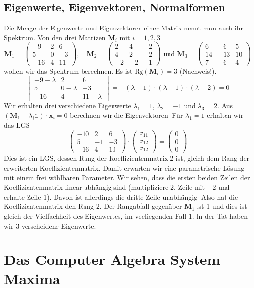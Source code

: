 \subsection{Eigenwerte, Eigenvektoren, Normalformen}
Die Menge der Eigenwerte und Eigenvektoren einer Matrix nennt man auch ihr Spektrum. Von den drei Matrizen $\mathbf{M}_i$ mit $i=1,2,3$
\[
  \mathbf{M}_1=\begin{pmatrix}
    -9&2&6\\5&0&-3\\-16&4&11
  \end{pmatrix},\quad
  \mathbf{M}_2=\begin{pmatrix}
    2&4&-2\\4&2&-2\\-2&-2&-1
  \end{pmatrix}\text{ und }
  \mathbf{M}_3=\begin{pmatrix}
    6&-6&5\\14&-13&10\\7&-6&4
  \end{pmatrix}
\]
wollen wir das Spektrum berechnen. Es ist $\text{Rg}(\mathbf{M}_i)=3$ (Nachweis!).
\[
  \begin{vmatrix}
    -9-\lambda&2&6\\5&0-\lambda&-3\\-16&4&11-\lambda
  \end{vmatrix}
  =-(\lambda-1)\cdot(\lambda+1)\cdot(\lambda-2)=0
\]
Wir erhalten drei verschiedene Eigenwerte $\lambda_1=1$, $\lambda_2=-1$ und $\lambda_3=2$. Aus $(\mathbf{M}_1-\lambda_i\mathds{1})\cdot\mathbf{x}_i=0$ berechnen wir die Eigenvektoren.  Für $\lambda_1=1$ erhalten wir das LGS \[
 \begin{pmatrix}-10&2&6\\5&-1&-3\\-16&4&10\end{pmatrix}\cdot
 \begin{pmatrix}x_{11}\\x_{12}\\x_{12}\end{pmatrix}=
 \begin{pmatrix}0\\0\\0\end{pmatrix}
\]
Dies ist ein LGS, dessen Rang der Koeffizientenmatrix 2 ist, gleich dem Rang der erweiterten Koeffizientenmatrix. Damit erwarten wir eine parametrische Lösung mit einem frei wählbaren Parameter.
Wir sehen, dass die ersten beiden Zeilen der Koeffizientenmatrix linear abhängig sind (multipliziere 2. Zeile mit $-2$ und erhalte Zeile 1). Davon ist allerdings die dritte Zeile unabhängig. Also hat die Koeffizientenmatrix den Rang 2. Der Rangabfall gegenüber $\mathbf{M}_1$ ist 1 und dies ist gleich der Vielfachheit des Eigenwertes, im voeliegenden Fall 1. In der Tat haben wir 3 verscheidene Eigenwerte.
\section{Das Computer Algebra System Maxima}

\newpage